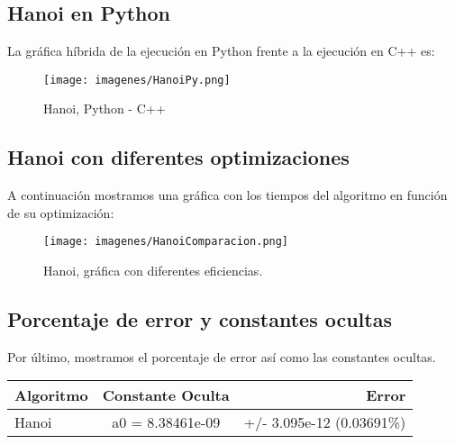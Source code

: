 \subsection{Hanoi en Python}
La gráfica híbrida de la ejecución en Python frente a la ejecución en C++ es:
\begin{figure}[H]
	\centering
	\texttt{[image: imagenes/HanoiPy.png]}
	\caption{Hanoi, Python - C++}
	\label{fig:E21}
\end{figure}



\subsection{Hanoi con diferentes optimizaciones}
A continuación mostramos una gráfica con los tiempos del algoritmo en función de su optimización:
\begin{figure}[H]
	\centering
	\texttt{[image: imagenes/HanoiComparacion.png]}
	\caption{Hanoi, gráfica con diferentes eficiencias.}
	\label{fig:E22}
\end{figure}



\subsection{Porcentaje de error y constantes ocultas}
Por último, mostramos el porcentaje de error así como las constantes ocultas.\\
\begin{center}
	\begin{tabular}{| l | c | r |}
		\hline
		\textbf{Algoritmo} & \textbf{Constante Oculta} & \textbf{Error} \\ \hline
		Hanoi & a0 = 8.38461e-09 & +/- 3.095e-12    (0.03691\%)\\ \hline
	\end{tabular}
\end{center}



